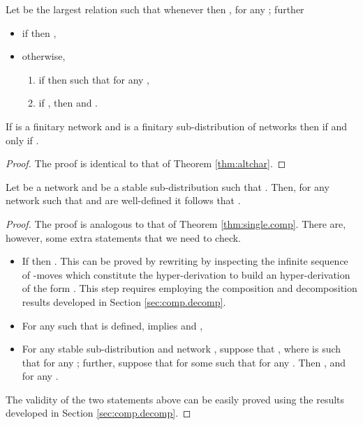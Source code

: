 \documentclass{LMCS}
\begin{document}
\begin{defi}
Let  be 
the largest relation such that whenever  
then ,  
for any ; further 
\begin{itemize}
\item if  then , 
\item otherwise, 
\begin{enumerate}[label=(\roman*)]
	\item if  then  
	such that  for any , 
	\item if , then  and .
\end{enumerate}
\end{itemize}
\end{defi}

\begin{thm}
\label{thm:ds.altchar}
If  is a finitary network and  is a finitary 
sub-distribution of networks then 
 if and only if .
\end{thm}

\begin{proof}
The proof is identical to that of Theorem \ref{thm:altchar}.
\end{proof}

\begin{thm}
\label{thm:ds.single.comp}
Let  be a network and  be a stable sub-distribution 
such that . Then, for any network 
 such that  and 
 are well-defined it follows 
that . 
\end{thm}

\begin{proof}
The proof is analogous to that of Theorem \ref{thm:single.comp}.
There are, however, some extra statements that we need to 
check. 

\begin{itemize}
\item If  
then . 
This can be proved by rewriting  
by inspecting the infinite 
sequence of -moves which constitute the 
hyper-derivation  
to build an hyper-derivation of the form . This step requires employing the composition and 
decomposition results developed in Section \ref{sec:comp.decomp}.

\item For any  such that 
 is defined,   
implies  and ,
\item For any stable sub-distribution  and network , 
suppose that , where  is such that 
 for any ; further, 
suppose that  
 for some  such that 
 for any . 
Then , and 
 for any .
\end{itemize}
The validity of the two statements above can be easily proved 
using the results developed in Section \ref{sec:comp.decomp}.
\end{proof}
\end{document}
